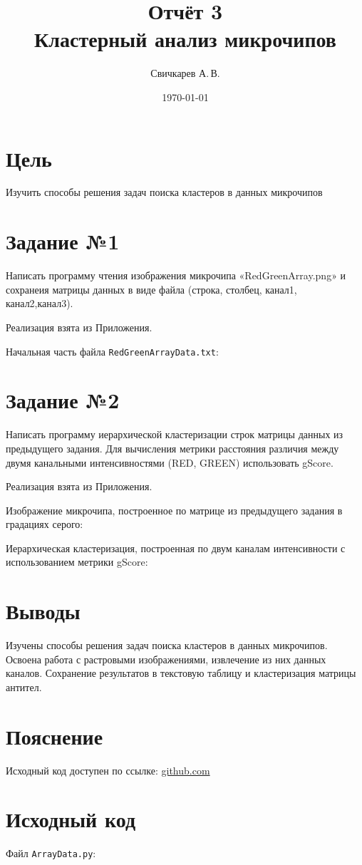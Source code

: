 \documentclass{article} %
\title{Отчёт 3\protect\\Кластерный анализ микрочипов} %
\author{Свичкарев А.\,В.} %
\date{\today} %
\begin{document}

\maketitle %

\section{Цель}
Изучить способы решения задач
поиска кластеров в данных микрочипов

\section{Задание №1}
Написать программу чтения
изображения микрочипа «RedGreenArray.png» и
сохранеия матрицы данных в виде файла
(строка, столбец, канал1, канал2,канал3).

Реализация взята из Приложения.

Начальная часть файла \verb$RedGreenArrayData.txt$:
% 

\clearpage
\section{Задание №2}
Написать программу иерархической кластеризации
строк матрицы данных из предыдущего задания.
Для вычисления метрики расстояния различия
между двумя канальными интенсивностями
(RED, GREEN) использовать gScore.
\bigskip

Реализация взята из Приложения.
\bigskip

Изображение микрочипа,
построенное по матрице
из предыдущего задания
в градациях серого:
\bigskip


\clearpage
Иерархическая кластеризация,
построенная по двум каналам
интенсивности с использованием
метрики gScore:
\bigskip


\clearpage
\section{Выводы}
Изучены способы решения задач поиска кластеров
в данных микрочипов.
Освоена работа с растровыми изображениями,
извлечение из них данных каналов.
Сохранение результатов в текстовую таблицу
и кластеризация матрицы антител.

\section{Пояснение}
Исходный код доступен по ссылке:
\href{https://github.com/SvichkarevAnatoly/Course-Python-Bioinformatics/tree/master/semester2/task4}
{github.com}

\section{Исходный код}
Файл \verb$ArrayData.py$:
% 
\end{document}
